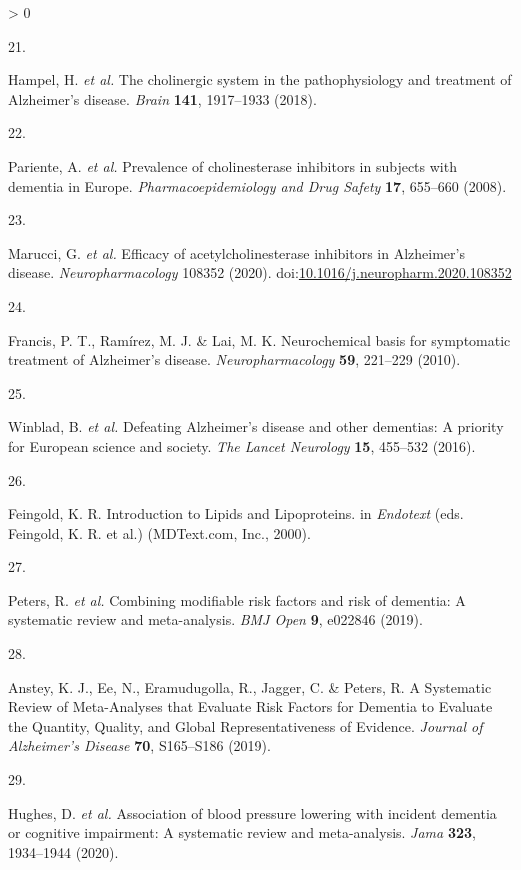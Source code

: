 \documentclass[a4paper, twoside]{templates/ociamthesis}
\newlength{\cslhangindent}
\newlength{\csllabelwidth}
\newenvironment{CSLReferences}[3] %
 {%
  \setlength{\parindent}{0pt}
  \ifodd #1 \everypar{\setlength{\hangindent}{\cslhangindent}}\ignorespaces\fi
  \ifnum #2 > 0
  \setlength{\parskip}{#2\baselineskip}
  \fi
 }%
 {}
\newcommand{\CSLLeftMargin}[1]{\parbox[t]{\maxof{\widthof{#1}}{\csllabelwidth}}{#1}}
\newcommand{\CSLRightInline}[1]{\parbox[t]{\linewidth - \csllabelwidth}{#1}}
\begin{document}
\begin{CSLReferences}{0}{0}
\leavevmode\hypertarget{ref-hampel2018}{}%
\CSLLeftMargin{21. }
\CSLRightInline{Hampel, H. \emph{et al.} The cholinergic system in the pathophysiology and treatment of {Alzheimer}'s disease. \emph{Brain} \textbf{141}, 1917--1933 (2018).}

\leavevmode\hypertarget{ref-pariente2008}{}%
\CSLLeftMargin{22. }
\CSLRightInline{Pariente, A. \emph{et al.} Prevalence of cholinesterase inhibitors in subjects with dementia in {Europe}. \emph{Pharmacoepidemiology and Drug Safety} \textbf{17}, 655--660 (2008).}

\leavevmode\hypertarget{ref-marucci2020}{}%
\CSLLeftMargin{23. }
\CSLRightInline{Marucci, G. \emph{et al.} Efficacy of acetylcholinesterase inhibitors in {Alzheimer}'s disease. \emph{Neuropharmacology} 108352 (2020). doi:\href{https://doi.org/10.1016/j.neuropharm.2020.108352}{10.1016/j.neuropharm.2020.108352}}

\leavevmode\hypertarget{ref-francis2010}{}%
\CSLLeftMargin{24. }
\CSLRightInline{Francis, P. T., Ramírez, M. J. \& Lai, M. K. Neurochemical basis for symptomatic treatment of {Alzheimer}'s disease. \emph{Neuropharmacology} \textbf{59}, 221--229 (2010).}

\leavevmode\hypertarget{ref-winblad2016}{}%
\CSLLeftMargin{25. }
\CSLRightInline{Winblad, B. \emph{et al.} Defeating {Alzheimer}'s disease and other dementias: A priority for {European} science and society. \emph{The Lancet Neurology} \textbf{15}, 455--532 (2016).}

\leavevmode\hypertarget{ref-feingold2000}{}%
\CSLLeftMargin{26. }
\CSLRightInline{Feingold, K. R. Introduction to {Lipids} and {Lipoproteins}. in \emph{Endotext} (eds. Feingold, K. R. et al.) ({MDText.com, Inc.}, 2000).}

\leavevmode\hypertarget{ref-peters2019}{}%
\CSLLeftMargin{27. }
\CSLRightInline{Peters, R. \emph{et al.} Combining modifiable risk factors and risk of dementia: A systematic review and meta-analysis. \emph{BMJ Open} \textbf{9}, e022846 (2019).}

\leavevmode\hypertarget{ref-anstey2019}{}%
\CSLLeftMargin{28. }
\CSLRightInline{Anstey, K. J., Ee, N., Eramudugolla, R., Jagger, C. \& Peters, R. A {Systematic Review} of {Meta}-{Analyses} that {Evaluate Risk Factors} for {Dementia} to {Evaluate} the {Quantity}, {Quality}, and {Global Representativeness} of {Evidence}. \emph{Journal of Alzheimer's Disease} \textbf{70}, S165--S186 (2019).}

\leavevmode\hypertarget{ref-hughes2020}{}%
\CSLLeftMargin{29. }
\CSLRightInline{Hughes, D. \emph{et al.} Association of blood pressure lowering with incident dementia or cognitive impairment: A systematic review and meta-analysis. \emph{Jama} \textbf{323}, 1934--1944 (2020).}


\end{CSLReferences}
\end{document}
